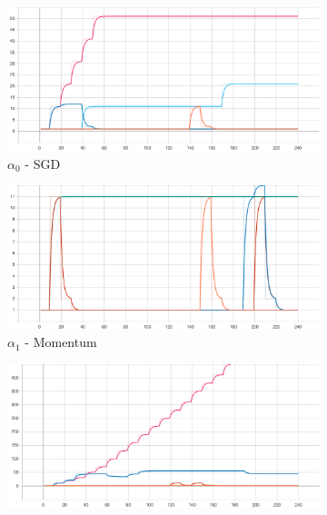 \begin{figure}[htbp]
    \begin{subfigure}{0.5\textwidth}
        \centering
        \includegraphics[width=\textwidth]{analysis/bhh_case_study/iris/alpha[0].png}
        \caption{$\alpha_{0}$ - \Acs{SGD}}
        \label{fig:results:case_study:iris:alpha:0}
    \end{subfigure}
    \begin{subfigure}{0.5\textwidth}
        \centering
        \includegraphics[width=\textwidth]{analysis/bhh_case_study/iris/alpha[1].png}
        \caption{$\alpha_{1}$ - \Acs{Momentum}}
        \label{fig:results:case_study:iris:alpha:1}
    \end{subfigure}
    \par\bigskip
    \begin{subfigure}{0.5\textwidth}
        \centering
        \includegraphics[width=\textwidth]{analysis/bhh_case_study/iris/alpha[2].png}

\end{subfigure}
\end{figure}

